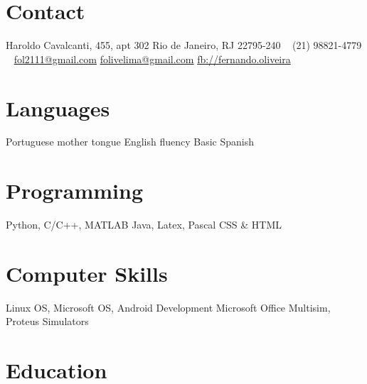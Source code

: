 \documentclass[]{friggeri-cv} %
\begin{document}


\vspace{1cm}

 
\begin{aside} %
\section{Contact}
Haroldo Cavalcanti, 455, apt 302
Rio de Janeiro, RJ
22795-240
~
(21) 98821-4779
~
\href{mailto:fol2111@gmail.com}{fol2111@gmail.com}
\href{mailto:folivelima@gmail.com}{folivelima@gmail.com}
\href{http://facebook.com/fernando.oliveira.1023}{fb://fernando.oliveira}
\section{Languages}
Portuguese mother tongue
English fluency
Basic Spanish
\section{Programming}
Python, C/C++, MATLAB
Java, Latex, Pascal  
CSS \& HTML
\section{Computer Skills}
Linux OS, Microsoft OS,
Android Development
Microsoft Office
Multisim, Proteus Simulators
\end{aside}


\section{Education}
\end{document}
